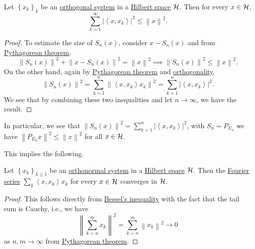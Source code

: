 \begin{theorem}\label{thm:Bessel-ineq}
	Let \(\left\{ x_k \right\} _k\) be an \hyperref[def:orthogonal-system]{orthogonal system} in a \hyperref[def:Hilbert-space]{Hilbert space} \(\mathcal{\MakeUppercase{h}} \). Then for every \(x\in \mathcal{\MakeUppercase{h}} \),
	\[
		\sum_{k=1}^{\infty}  \left\vert \left\langle x, x_{k}  \right\rangle  \right\vert ^{2} \leq \left\lVert x\right\rVert ^{2} .
	\]
\end{theorem}
\begin{proof}
	To estimate the size of \(S_n(x)\), consider \(x - S_n(x)\) and from \hyperref[thm:Pythagorean-theorem]{Pythagorean theorem},
	\[
		\left\lVert S_n(x)\right\rVert ^{2} + \left\lVert x - S_n (x)\right\rVert ^{2} = \left\lVert x\right\rVert ^{2} \implies \left\lVert S_{n} (x)\right\rVert ^{2} \leq \left\lVert x\right\rVert ^{2}.
	\]
	On the other hand, again by \hyperref[thm:Pythagorean-theorem]{Pythagorean theorem} and \hyperref[def:orthogonal]{orthogonality},
	\[
		\left\lVert S_{n} (x)\right\rVert ^{2} = \sum_{k=1} ^n \left\lVert \left\langle x, x_k \right\rangle x_k \right\rVert ^{2} = \sum_{k=1} ^n \left\vert \left\langle x, x_k \right\rangle  \right\vert ^{2} .
	\]
	We see that by combining these two inequalities and let \(n\to \infty \), we have the result.
\end{proof}
\begin{remark}
	In particular, we see that \(\left\lVert S_n (x)\right\rVert ^{2} = \sum_{k=1}^{n} \left\vert \left\langle x, x_{k}  \right\rangle \right\vert ^{2}\), with \(S_n = P_{E_n}\) we have \(\left\lVert P_{E_n} x \right\rVert^{2} \leq \left\lVert x\right\rVert ^{2}\) for all \(x\in \mathcal{\MakeUppercase{h}} \).
\end{remark}

This implies the following.

\begin{corollary}\label{col:lec4}
	Let \(\left\{ x_k \right\} _{k \geq 1}\) be an \hyperref[def:orthonormal-system]{orthonormal system} in a \hyperref[def:Hilbert-space]{Hilbert space} \(\mathcal{\MakeUppercase{h}} \). Then the \hyperref[def:Fourier-series]{Fourier series} \(\sum_{k} \left\langle x, x_{k}  \right\rangle x_{k}  \) for every \(x\in \mathcal{\MakeUppercase{h}} \) converges in \(\mathcal{\MakeUppercase{h}} \).
\end{corollary}
\begin{proof}
	This follows directly from \hyperref[thm:Bessel-ineq]{Bessel's inequality} with the fact that the tail sum is Cauchy, i.e., we have
	\[
		\left\lVert \sum_{k=n}^m x_k\right\rVert ^2 = \sum_{k=n} ^m \left\lVert x_k\right\rVert ^{2} \to 0
	\]
	as \(n, m \to \infty \) from \hyperref[thm:Pythagorean-theorem]{Pythagorean theorem}.
\end{proof}

